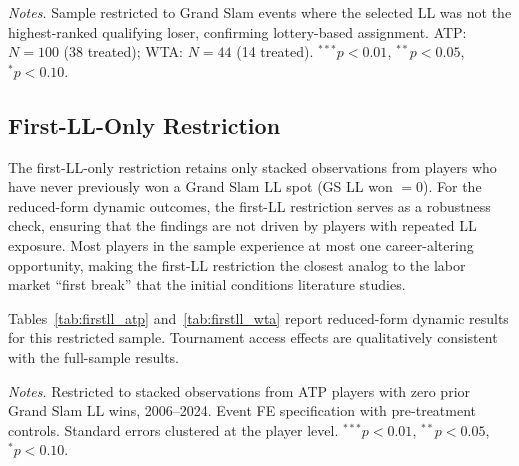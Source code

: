 \begin{table}[htbp]
\centering
\caption{Verified Lottery Subsample: Effect on Career Outcomes}
\label{tab:verified}
\begin{threeparttable}
\small

\begin{tablenotes}
\footnotesize
\item \textit{Notes.} Sample restricted to Grand Slam events where the selected LL was not the highest-ranked qualifying loser, confirming lottery-based assignment. ATP: $N = 100$ (38 treated); WTA: $N = 44$ (14 treated).  $^{***}p<0.01$, $^{**}p<0.05$, $^{*}p<0.10$.
\end{tablenotes}
\end{threeparttable}
\end{table}

\subsection{First-LL-Only Restriction}
\label{sec:robustness_firstll}

The first-LL-only restriction retains only stacked observations from players who have never previously won a Grand Slam LL spot (GS LL won $= 0$). For the reduced-form dynamic outcomes, the first-LL restriction serves as a robustness check, ensuring that the findings are not driven by players with repeated LL exposure. Most players in the sample experience at most one career-altering opportunity, making the first-LL restriction the closest analog to the labor market ``first break'' that the initial conditions literature studies.

Tables~\ref{tab:firstll_atp} and~\ref{tab:firstll_wta} report reduced-form dynamic results for this restricted sample. Tournament access effects are qualitatively consistent with the full-sample results.

\begin{table}[htbp]
\centering
\caption{First-LL-Only ATP Grand Slam: Dynamic Effects}
\label{tab:firstll_atp}
\begin{threeparttable}
\small

\begin{tablenotes}
\footnotesize
\item \textit{Notes.} Restricted to stacked observations from ATP players with zero prior Grand Slam LL wins, 2006--2024. Event FE specification with pre-treatment controls. Standard errors clustered at the player level. $^{***}p<0.01$, $^{**}p<0.05$, $^{*}p<0.10$.
\end{tablenotes}
\end{threeparttable}
\end{table}

